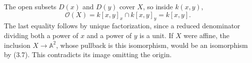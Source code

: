 The open subsets $D(x)$ and $D(y)$ cover $X$, so inside $k(x,y)$,
\[\mathcal O(X)=k[x,y]_x\cap k[x,y]_y=k[x,y].\]
The last equality follows by unique factorization, since a reduced denominator dividing both a power of $x$ and a power of $y$ is a unit. If $X$ were affine, the inclusion $X\to\mathbb A^2$, whose pullback is this isomorphism, would be an isomorphism by (3.7). This contradicts its image omitting the origin.
